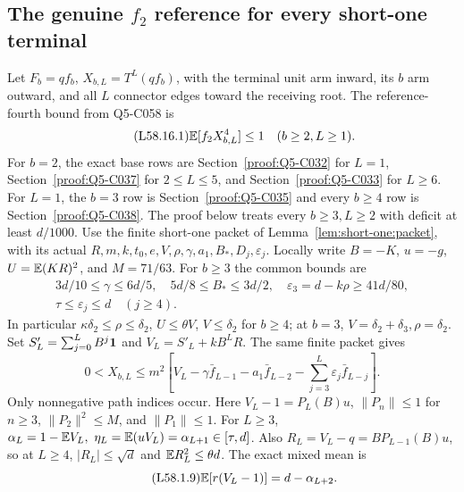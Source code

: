 \subsection{The genuine $f_2$ reference for every short-one terminal}\label{proof:Q5-C058}
Let $F_b=qf_b$, $X_{b,L}=T^L(qf_b)$, with the terminal unit arm
inward, its $b$ arm outward, and all $L$ connector edges toward the
receiving root. The reference-fourth bound from Q5-C058 is
\begin{equation}\tag{L58.16.1}\label{eq:L58:claim}
\mathbb E[f_2X_{b,L}^4]\le1\quad(b\ge2,L\ge1).
\end{equation}
For $b=2$, the exact base rows are Section~\ref{proof:Q5-C032} for $L=1$,
Section~\ref{proof:Q5-C037} for $2\le L\le5$, and
Section~\ref{proof:Q5-C033} for $L\ge6$.
For $L=1$, the $b=3$ row is Section~\ref{proof:Q5-C035} and every
$b\ge4$ row is Section~\ref{proof:Q5-C038}.
The proof below treats every $b\ge3,L\ge2$ with deficit at least $d/1000$.
Use the finite short-one packet of Lemma~\ref{lem:short-one:packet},
with its actual \(R,m,k,t_0,e,V,\rho,\gamma,a_1,B_*,D_j,\varepsilon_j\).
Locally write \(B=-K\), \(u=-g\), \(U=\mathbb E(KR)^2\), and \(M=71/63\).
For \(b\ge3\) the common bounds are
\begin{equation}\tag{L58.1.6}\label{eq:L58:finiteinputs}
\begin{gathered}
3d/10\le\gamma\le6d/5,\quad5d/8\le B_*\le3d/2,\quad
\varepsilon_3=d-k\rho\ge41d/80,\\
\tau\le\varepsilon_j\le d\quad(j\ge4).
\end{gathered}
\end{equation}
In particular \(\kappa\delta_2\le\rho\le\delta_2\), \(U\le\theta V\),
\(V\le\delta_2\) for \(b\ge4\); at \(b=3\),
\(V=\delta_2+\delta_3,\rho=\delta_2\).
Set \(S'_L=\sum_{j=0}^LB^j\mathbf1\) and \(V_L=S'_L+kB^LR\).
The same finite packet gives
\begin{equation}\tag{L58.1.7}\label{eq:L58:propagation}
0<X_{b,L}\le m^2\left[
V_L-\gamma\bar f_{L-1}-a_1\bar f_{L-2}
-\sum_{j=3}^L\varepsilon_j\bar f_{L-j}\right].
\end{equation}
Only nonnegative path indices occur.
Here \(V_L-1=P_L(B)u\),
\(\|P_n\|\le1\) for \(n\ge3\),
\(\|P_2\|^2\le M\), and \(\|P_1\|\le1\).
For \(L\ge3\),
\(\alpha_L=1-\E V_L,\ \eta_L=\E(uV_L)=\alpha_{L+1}\in[\tau,d]\).
Also \(R_L=V_L-q=BP_{L-1}(B)u\), so at \(L\ge4\),
\(|R_L|\le\sqrt d\) and \(\mathbb E R_L^2\le\theta d\).
The exact mixed mean is
\begin{equation}\tag{L58.1.9}\label{eq:L58:receiving}
\mathbb E[r(V_L-1)]=d-\alpha_{L+2}.
\end{equation}

